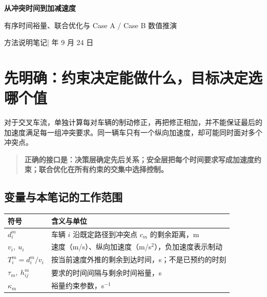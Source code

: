 \documentclass[UTF8,fontset=fandol,11pt,a4paper]{ctexart}
\newcommand{\nom}{\mathrm{nom}}
\newcommand{\key}[1]{\begin{quote}\color{Teal}\bfseries #1\end{quote}}
\begin{document}
\begin{center}
{\LARGE\bfseries\color{Navy}从冲突时间到加减速度}\par\vspace{5pt}
{\large 有序时间裕量、联合优化与 Case A / Case B 数值推演}\par\vspace{5pt}
{\small 方法说明笔记\quad | 年 9 月 24 日}
\end{center}

\section{先明确：约束决定能做什么，目标决定选哪个值}
对于交叉车流，单独计算每对车辆的制动修正，再把修正相加，并不能保证最后的加速度满足每一组冲突要求。同一辆车只有一个纵向加速度，却可能同时面对多个冲突点。

\key{正确的接口是：决策层确定先后关系；安全层把每个时间要求写成加速度约束；联合优化在所有约束的交集中选择控制。}

\begin{center}
\end{center}

\subsection{变量与本笔记的工作范围}
\begin{center}\small
\begin{tabular}{p{3.1cm}p{10.5cm}}
\toprule
符号 & 含义与单位\\\midrule
$d_i^m$ & 车辆 $i$ 沿既定路径到冲突点 $c_m$ 的剩余距离，m\\
$v_i,\ u_i$ & 速度（m/s）、纵向加速度（m/s$^2$），负加速度表示制动\\
$T_i^m=d_i^m/v_i$ & 按当前速度外推的剩余到达时间，s；不是已预约的时刻\\
$\tau_m,\ h_{ij}^m$ & 要求的时间间隔与剩余时间裕量，s\\
$\kappa_m$ & 裕量约束参数，s$^{-1}$\\\bottomrule
\end{tabular}\end{center}
\end{document}
